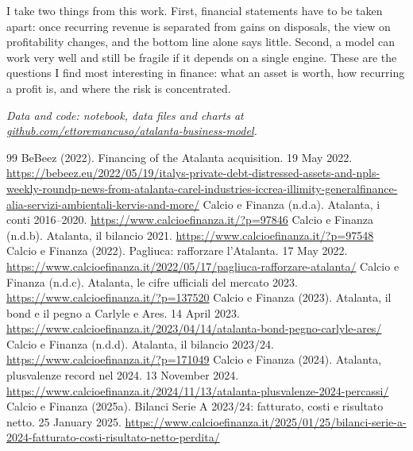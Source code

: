 \documentclass[11pt,a4paper]{article}
\begin{document}
I take two things from this work. First, financial statements have to be taken apart: once recurring revenue is separated from gains on disposals, the view on profitability changes, and the bottom line alone says little. Second, a model can work very well and still be fragile if it depends on a single engine. These are the questions I find most interesting in finance: what an asset is worth, how recurring a profit is, and where the risk is concentrated.

\medskip
\textit{Data and code: notebook, data files and charts at \href{https://github.com/ettoremancuso/atalanta-business-model}{github.com/ettoremancuso/atalanta-business-model}.}

\renewcommand{\refname}{References}
\begin{thebibliography}{99}\small\setlength{\itemsep}{2pt}
 BeBeez (2022). Financing of the Atalanta acquisition. 19 May 2022. \url{https://bebeez.eu/2022/05/19/italys-private-debt-distressed-assets-and-npls-weekly-roundp-news-from-atalanta-carel-industries-iccrea-illimity-generalfinance-alia-servizi-ambientali-kervis-and-more/}
 Calcio e Finanza (n.d.a). Atalanta, i conti 2016--2020. \url{https://www.calcioefinanza.it/?p=97846}
 Calcio e Finanza (n.d.b). Atalanta, il bilancio 2021. \url{https://www.calcioefinanza.it/?p=97548}
 Calcio e Finanza (2022). Pagliuca: rafforzare l'Atalanta. 17 May 2022. \url{https://www.calcioefinanza.it/2022/05/17/pagliuca-rafforzare-atalanta/}
 Calcio e Finanza (n.d.c). Atalanta, le cifre ufficiali del mercato 2023. \url{https://www.calcioefinanza.it/?p=137520}
 Calcio e Finanza (2023). Atalanta, il bond e il pegno a Carlyle e Ares. 14 April 2023. \url{https://www.calcioefinanza.it/2023/04/14/atalanta-bond-pegno-carlyle-ares/}
 Calcio e Finanza (n.d.d). Atalanta, il bilancio 2023/24. \url{https://www.calcioefinanza.it/?p=171049}
 Calcio e Finanza (2024). Atalanta, plusvalenze record nel 2024. 13 November 2024. \url{https://www.calcioefinanza.it/2024/11/13/atalanta-plusvalenze-2024-percassi/}
 Calcio e Finanza (2025a). Bilanci Serie A 2023/24: fatturato, costi e risultato netto. 25 January 2025. \url{https://www.calcioefinanza.it/2025/01/25/bilanci-serie-a-2024-fatturato-costi-risultato-netto-perdita/}

\end{thebibliography}
\end{document}

